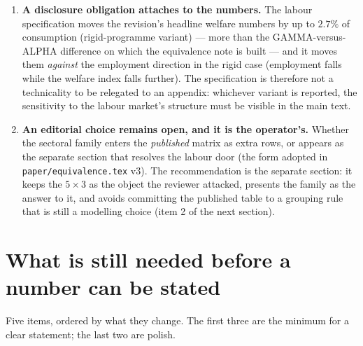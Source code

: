 \documentclass[11pt]{article}
\begin{document}
\begin{enumerate}
      reallocation.
\item \textbf{A disclosure obligation attaches to the numbers.} The labour
      specification moves the revision's headline welfare numbers by up to
      $2.7\%$ of consumption (rigid-programme variant) --- more than the
      GAMMA-versus-ALPHA difference on which the equivalence note is built ---
      and it moves them \emph{against} the employment direction in the rigid
      case (employment falls while the welfare index falls further). The
      specification is therefore not a technicality to be relegated to an
      appendix: whichever variant is reported, the sensitivity to the labour
      market's structure must be visible in the main text.
\item \textbf{An editorial choice remains open, and it is the operator's.}
      Whether the sectoral family enters the \emph{published} matrix as extra
      rows, or appears as the separate section that resolves the labour door
      (the form adopted in \texttt{paper/equivalence.tex} v3). The
      recommendation is the separate section: it keeps the $5\times3$ as the
      object the reviewer attacked, presents the family as the answer to it,
      and avoids committing the published table to a grouping rule that is
      still a modelling choice (item 2 of the next section).
\end{enumerate}

\section{What is still needed before a number can be stated}

Five items, ordered by what they change. The first three are the minimum for a
clear statement; the last two are polish.
\end{document}
